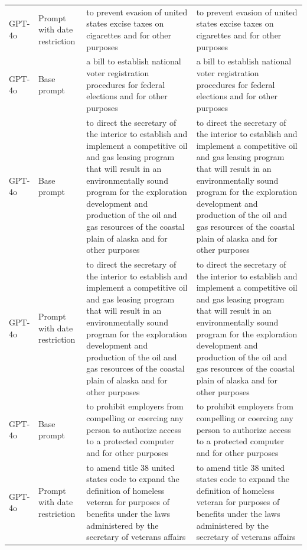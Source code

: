 \begin{longtable}{>{\raggedright\arraybackslash}p{1.4cm}>{\raggedright\arraybackslash}p{1.4cm}>{\raggedright\arraybackslash}p{5.5cm}>{\raggedright\arraybackslash}p{5.5cm}}
GPT-4o & Prompt with date restriction & to prevent evasion of united states excise taxes on cigarettes and for other purposes & to prevent evasion of united states excise taxes on cigarettes and for other purposes\\
GPT-4o & Base prompt & a bill to establish national voter registration procedures for federal elections and for other purposes & a bill to establish national voter registration procedures for federal elections and for other purposes\\
GPT-4o & Base prompt & to direct the secretary of the interior to establish and implement a competitive oil and gas leasing program that will result in an environmentally sound program for the exploration development and production of the oil and gas resources of the coastal plain of alaska and for other purposes & to direct the secretary of the interior to establish and implement a competitive oil and gas leasing program that will result in an environmentally sound program for the exploration development and production of the oil and gas resources of the coastal plain of alaska and for other purposes\\
GPT-4o & Prompt with date restriction & to direct the secretary of the interior to establish and implement a competitive oil and gas leasing program that will result in an environmentally sound program for the exploration development and production of the oil and gas resources of the coastal plain of alaska and for other purposes & to direct the secretary of the interior to establish and implement a competitive oil and gas leasing program that will result in an environmentally sound program for the exploration development and production of the oil and gas resources of the coastal plain of alaska and for other purposes\\
GPT-4o & Base prompt & to prohibit employers from compelling or coercing any person to authorize access to a protected computer and for other purposes & to prohibit employers from compelling or coercing any person to authorize access to a protected computer and for other purposes\\
GPT-4o & Prompt with date restriction & to amend title 38 united states code to expand the definition of homeless veteran for purposes of benefits under the laws administered by the secretary of veterans affairs & to amend title 38 united states code to expand the definition of homeless veteran for purposes of benefits under the laws administered by the secretary of veterans affairs\\

\end{longtable}
